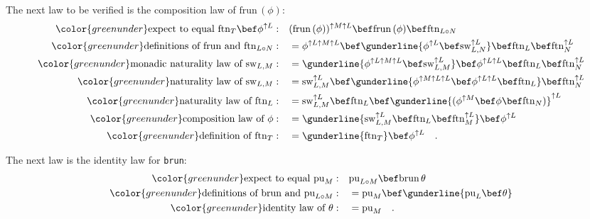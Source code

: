 The next law to be verified is the composition law of $\text{frun}\,(\phi)$:
\begin{align*}
{\color{greenunder}\text{expect to equal }\text{ftn}_{T}\bef\phi^{\uparrow L}:}\quad & (\text{frun}\,(\phi))^{\uparrow M\uparrow L}\bef\text{frun}\,(\phi)\bef\text{ftn}_{L\circ N}\\
{\color{greenunder}\text{definitions of }\text{frun}\text{ and }\text{ftn}_{L\circ N}:}\quad & =\phi^{\uparrow L\uparrow M\uparrow L}\bef\gunderline{\phi^{\uparrow L}\bef\text{sw}_{L,N}^{\uparrow L}}\bef\text{ftn}_{L}\bef\text{ftn}_{N}^{\uparrow L}\\
{\color{greenunder}\text{monadic naturality law of }\text{sw}_{L,M}:}\quad & =\gunderline{\phi^{\uparrow L\uparrow M\uparrow L}\bef\text{sw}_{L,M}^{\uparrow L}}\bef\phi^{\uparrow L\uparrow L}\bef\text{ftn}_{L}\bef\text{ftn}_{N}^{\uparrow L}\\
{\color{greenunder}\text{naturality law of }\text{sw}_{L,M}:}\quad & =\text{sw}_{L,M}^{\uparrow L}\bef\gunderline{\phi^{\uparrow M\uparrow L\uparrow L}\bef\phi^{\uparrow L\uparrow L}\bef\text{ftn}_{L}}\bef\text{ftn}_{N}^{\uparrow L}\\
{\color{greenunder}\text{naturality law of }\text{ftn}_{L}:}\quad & =\text{sw}_{L,M}^{\uparrow L}\bef\text{ftn}_{L}\bef\gunderline{(\phi^{\uparrow M}\bef\phi\bef\text{ftn}_{N})}^{\uparrow L}\\
{\color{greenunder}\text{composition law of }\phi:}\quad & =\gunderline{\text{sw}_{L,M}^{\uparrow L}\bef\text{ftn}_{L}\bef\text{ftn}_{M}^{\uparrow L}}\bef\phi^{\uparrow L}\\
{\color{greenunder}\text{definition of }\text{ftn}_{T}:}\quad & =\gunderline{\text{ftn}_{T}}\bef\phi^{\uparrow L}\quad.
\end{align*}

The next law is the identity law for \lstinline!brun!:
\begin{align*}
{\color{greenunder}\text{expect to equal }\text{pu}_{M}:}\quad & \text{pu}_{L\circ M}\bef\text{brun}\,\theta\\
{\color{greenunder}\text{definitions of }\text{brun}\text{ and }\text{pu}_{L\circ M}:}\quad & =\text{pu}_{M}\bef\gunderline{\text{pu}_{L}\bef\theta}\\
{\color{greenunder}\text{identity law of }\theta:}\quad & =\text{pu}_{M}\quad.
\end{align*}

